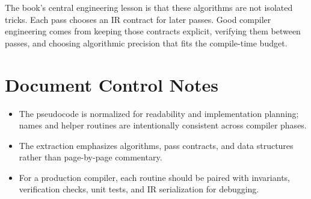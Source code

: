 \documentclass[10pt,letterpaper]{article}
\begin{document}
The book's central engineering lesson is that these algorithms are not isolated tricks. Each pass chooses an IR contract for later passes. Good compiler engineering comes from keeping those contracts explicit, verifying them between passes, and choosing algorithmic precision that fits the compile-time budget.

\clearpage
\section*{Document Control Notes}
{}
\begin{itemize}
\item The pseudocode is normalized for readability and implementation planning; names and helper routines are intentionally consistent across compiler phases.
\item The extraction emphasizes algorithms, pass contracts, and data structures rather than page-by-page commentary.
\item For a production compiler, each routine should be paired with invariants, verification checks, unit tests, and IR serialization for debugging.
\end{itemize}
\end{document}
